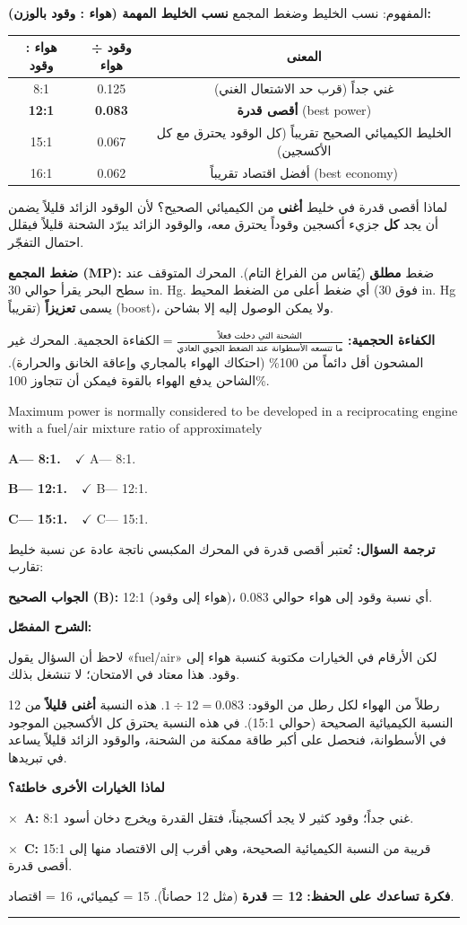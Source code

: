 \documentclass[11pt,a4paper]{article}
\newcommand{\en}[1]{\textenglish{#1}}
\newcommand{\correctletter}{}
\newcommand{\opt}[2]{%
  \ifdefstring{\correctletter}{#1}%
    {\textcolor{ansgreen}{\textbf{#1— #2\ \ $\checkmark$}}}%
    {#1— #2}\par}
\newcommand{\Q}[6]{%
  \renewcommand{\correctletter}{#6}%
  \par\bigskip
  \phantomsection\label{q#1}%
  \begin{tcolorbox}[enhanced,breakable,colback=qback,colframe=qframe,
      arc=2mm,boxrule=0.8pt,fonttitle=\bfseries,
      title={\en{Question #1}}]
    \begin{english}
      #2\par\smallskip
      \opt{A}{#3}\opt{B}{#4}\opt{C}{#5}
    \end{english}
  \end{tcolorbox}}
\newcommand{\tr}[1]{\textbf{\textcolor{qframe}{ترجمة السؤال:}} #1\par}
\newcommand{\ans}[2]{%
  \begin{tcolorbox}[colback=ansback,colframe=ansgreen,boxrule=0.6pt,arc=1.5mm,
      left=4pt,right=4pt,top=2pt,bottom=2pt]
    \textbf{\textcolor{ansgreen}{الجواب الصحيح (\en{#1}):}} #2
  \end{tcolorbox}}
\newcommand{\sharh}[1]{\textbf{\textcolor{conceptc}{الشرح المفصّل:}}\par #1\par}
\newcommand{\nohead}{\textbf{\textcolor{wrongc}{لماذا الخيارات الأخرى خاطئة؟}}\par}
\newcommand{\no}[2]{\hspace*{1em}\textcolor{wrongc}{$\times$}\ \textbf{\en{#1}:} #2\par}
\newcommand{\tip}[1]{%
  \begin{tcolorbox}[colback=tipback,colframe=tipframe,boxrule=0.5pt,arc=1.5mm,
      left=4pt,right=4pt,top=2pt,bottom=2pt]
    \textbf{فكرة تساعدك على الحفظ:} #1
  \end{tcolorbox}}
\newcommand{\qsep}{\par\medskip\noindent\textcolor{qframe!40}{\rule{\linewidth}{0.4pt}}\par}
\begin{document}
\begin{concept}{المفهوم: نسب الخليط وضغط المجمع}
\textbf{نسب الخليط المهمة (هواء : وقود بالوزن):}
\begin{center}
\begin{tabular}{|c|c|c|}
\hline
\textbf{هواء : وقود} & \textbf{وقود ÷ هواء} & \textbf{المعنى}\\\hline
8:1 & 0.125 & غني جداً (قرب حد الاشتعال الغني)\\\hline
\textbf{12:1} & \textbf{0.083} & \textbf{أقصى قدرة} (\en{best power})\\\hline
15:1 & 0.067 & الخليط الكيميائي الصحيح تقريباً (كل الوقود يحترق مع كل الأكسجين)\\\hline
16:1 & 0.062 & أفضل اقتصاد تقريباً (\en{best economy})\\\hline
\end{tabular}
\end{center}
لماذا أقصى قدرة في خليط \textbf{أغنى} من الكيميائي الصحيح؟ لأن الوقود الزائد قليلاً يضمن أن يجد \textbf{كل} جزيء أكسجين وقوداً يحترق معه، والوقود الزائد يبرّد الشحنة قليلاً فيقلل احتمال التفجّر.

\textbf{ضغط المجمع (\en{MP}):} ضغط \textbf{مطلق} (يُقاس من الفراغ التام). المحرك المتوقف عند سطح البحر يقرأ حوالي 30 \en{in. Hg}. أي ضغط أعلى من الضغط المحيط (فوق 30 \en{in. Hg} تقريباً) يسمى \textbf{تعزيزاً} (\en{boost})، ولا يمكن الوصول إليه إلا بشاحن.

\textbf{الكفاءة الحجمية:} \(\displaystyle \text{الكفاءة الحجمية} = \frac{\text{الشحنة التي دخلت فعلاً}}{\text{ما تتسعه الأسطوانة عند الضغط الجوي العادي}}\). المحرك غير المشحون أقل دائماً من 100\% (احتكاك الهواء بالمجاري وإعاقة الخانق والحرارة). الشاحن يدفع الهواء بالقوة فيمكن أن تتجاوز 100\%.
\end{concept}

\Q{8771}{Maximum power is normally considered to be developed in a reciprocating engine with a fuel/air mixture ratio of approximately}
{8:1.}
{12:1.}
{15:1.}{B}
\tr{تُعتبر أقصى قدرة في المحرك المكبسي ناتجة عادة عن نسبة خليط تقارب:}
\ans{B}{12:1 (هواء إلى وقود)، أي نسبة وقود إلى هواء حوالي 0.083.}
\sharh{لاحظ أن السؤال يقول «\en{fuel/air}» لكن الأرقام في الخيارات مكتوبة كنسبة هواء إلى وقود. هذا معتاد في الامتحان؛ لا تنشغل بذلك.

12 رطلاً من الهواء لكل رطل من الوقود: $1 \div 12 = 0.083$. هذه النسبة \textbf{أغنى قليلاً} من النسبة الكيميائية الصحيحة (حوالي 15:1). في هذه النسبة يحترق كل الأكسجين الموجود في الأسطوانة، فنحصل على أكبر طاقة ممكنة من الشحنة، والوقود الزائد قليلاً يساعد في تبريدها.}
\nohead
\no{A}{8:1 غني جداً؛ وقود كثير لا يجد أكسجيناً، فتقل القدرة ويخرج دخان أسود.}
\no{C}{15:1 قريبة من النسبة الكيميائية الصحيحة، وهي أقرب إلى الاقتصاد منها إلى أقصى قدرة.}
\tip{\textbf{12 = قدرة} (مثل 12 حصاناً). 15 = كيميائي، 16 = اقتصاد.}
\qsep
\end{document}
